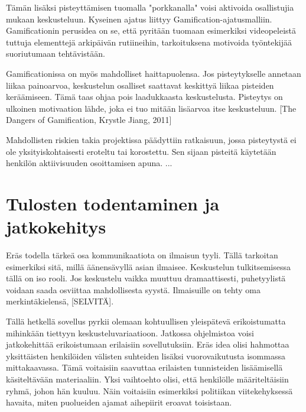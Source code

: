 \documentclass[11pt,a4paper,oneside]{memoir}
\begin{document}
Tämän lisäksi pisteyttämisen tuomalla "porkkanalla" voisi aktivoida osallistujia mukaan keskusteluun. Kyseinen ajatus liittyy Gamification-ajatusmalliin. Gamificationin perusidea on se, että pyritään tuomaan esimerkiksi videopeleistä tuttuja elementtejä arkipäivän rutiineihin, tarkoituksena motivoida työntekijää suoriutumaan tehtävistään.

Gamificationissa on myös mahdolliset haittapuolensa. Jos pisteytykselle annetaan liikaa painoarvoa, keskustelun osalliset saattavat keskittyä liikaa pisteiden keräämiseen. Tämä taas ohjaa pois laadukkaasta keskustelusta. Pisteytys on ulkoinen motivaation lähde, joka ei tuo mitään lisäarvoa itse keskusteluun. [The Dangers of Gamification, Krystle Jiang, 2011]

Mahdollisten riskien takia projektissa päädyttiin ratkaisuun, jossa pisteytystä ei ole yksityiskohtaisesti eroteltu tai korostettu. Sen sijaan pisteitä käytetään henkilön aktiivisuuden osoittamisen apuna.
...

\chapter{Tulosten todentaminen ja jatkokehitys}
Eräs todella tärkeä osa kommunikaatiota on ilmaisun tyyli. Tällä tarkoitan esimerkiksi sitä, millä äänensävyllä asian ilmaisee. Keskustelun tulkitsemisessa tällä on iso rooli. Jos keskustelu vaikka muuttuu dramaattisesti, puhetyylistä voidaan saada osviittaa mahdollisesta syystä. Ilmaisuille on tehty oma merkintäkielensä, [SELVITÄ].

Tällä hetkellä sovellus pyrkii olemaan kohtuullisen yleispätevä erikoistumatta mihinkään tiettyyn keskusteluvariaatioon. Jatkossa ohjelmistoa voisi jatkokehittää erikoistumaan erilaisiin sovellutuksiin. Eräs idea olisi hahmottaa yksittäisten henkilöiden välisten suhteiden lisäksi vuorovaikutusta isommassa mittakaavassa. Tämä voitaisiin saavuttaa erilaisten tunnisteiden lisäämisellä käsiteltävään materiaaliin. Yksi vaihtoehto olisi, että henkilölle määriteltäisiin ryhmä, johon hän kuuluu. Näin voitaisiin esimerkiksi politiikan viitekehyksessä havaita, miten puolueiden ajamat aihepiirit eroavat toisistaan.
\end{document}
